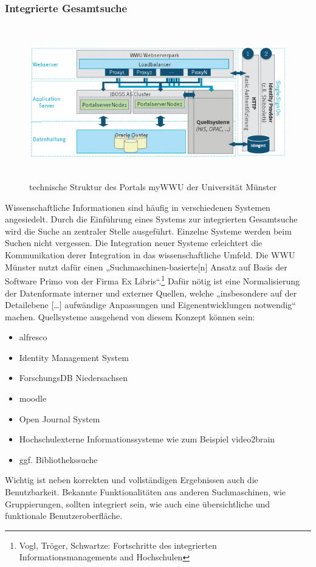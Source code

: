 \documentclass[a4paper]{article}
\newcommand\liststyleLiii{%
\renewcommand\labelitemi{•}
\renewcommand\labelitemii{◦}
\renewcommand\labelitemiii{${\blacksquare}$}
\renewcommand\labelitemiv{•}
}
\begin{document}
\subsubsection[Integrierte Gesamtsuche]{Integrierte Gesamtsuche}
\begin{figure}
\centering
\includegraphics[width=15.501cm,height=6.675cm]{VorlaufigeSollSituationeblingsprafkeluebke-img/VorlaufigeSollSituationeblingsprafkeluebke-img004.png}
\caption[technische Struktur des Portals myWWU der Universität Münster]{technische Struktur des Portals myWWU der
Universität Münster}

\end{figure}
{\sffamily
Wissenschaftliche Informationen sind häufig in verschiedenen Systemen angesiedelt. Durch die Einführung eines Systems
zur integrierten Gesamtsuche wird die Suche an zentraler Stelle ausgeführt. Einzelne Systeme werden beim Suchen nicht
vergessen. Die Integration neuer Systeme erleichtert die Kommunikation derer Integration in das wissenschaftliche
Umfeld. Die WWU Münster nutzt dafür einen „Suchmaschinen-basierte[n] Ansatz auf Basis der Software Primo von der Firma
Ex Libris“.\footnote{Vogl, Tröger, Schwartze: Fortschritte des integrierten Informationsmanagements and Hochschulen}}
{\sffamily
Dafür nötig ist eine Normalisierung der Datenformate interner und externer Quellen, welche „insbesondere auf der
Detailebene […] aufwändige Anpassungen und Eigenentwicklungen notwendig“ machen.}
\clearpage
\bigskip
{\sffamily
Quellsysteme ausgehend von diesem Konzept können sein:}

\liststyleLiii
\begin{itemize}
\item {\sffamily
alfresco}
\item {\sffamily
Identity Management System}
\item {\sffamily
ForschungsDB Niedersachsen}
\item {\sffamily
moodle}
\item {\sffamily
Open Journal System}
\item {\sffamily
Hochschulexterne Informationssysteme wie zum Beispiel video2brain}
\item {\sffamily
ggf. Bibliothekssuche}
\end{itemize}
{\sffamily
Wichtig ist neben korrekten und vollständigen Ergebnissen auch die Benutzbarkeit. Bekannte Funktionalitäten aus anderen
Suchmaschinen, wie Gruppierungen, sollten integriert sein, wie auch eine übersichtliche und funktionale
Benutzeroberfläche.}
\end{document}
